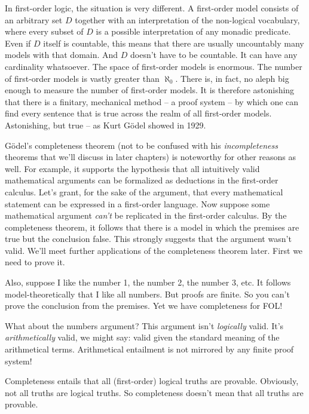 In first-order logic,
the situation is very different.
A first-order model consists of an arbitrary set $D$
together with an interpretation of the non-logical vocabulary,
where every subset of $D$ is a possible interpretation of any monadic predicate.
Even if $D$ itself is countable,
this means that there are usually uncountably many models with that domain.
And $D$ doesn't have to be countable.
It can have any cardinality whatsoever.
The space of first-order models is enormous.
The number of first-order models is vastly greater than $\aleph_0$.
There is, in fact, no aleph big enough to measure the number of first-order models.
It is therefore astonishing that
there is a finitary, mechanical method
-- a proof system --
by which one can find every sentence
that is true across the realm of all first-order models.
Astonishing, but true --
as Kurt Gödel showed in 1929.

Gödel's completeness theorem
(not to be confused with his \emph{incompleteness} theorems
that we'll discuss in later chapters)
is noteworthy for other reasons as well.
For example,
it supports the hypothesis
that all intuitively valid mathematical arguments can be formalized
as deductions in the first-order calculus.
Let's grant, for the sake of the argument, that
every mathematical statement can be expressed in a first-order language.
Now suppose some mathematical argument \emph{can't} be replicated in the first-order calculus.
By the completeness theorem,
it follows that
there is a model in which the premises are true but the conclusion false.
This strongly suggests that the argument wasn't valid.
We'll meet further applications of the completeness theorem later.
First we need to prove it.

\iffalse

Also,
suppose I like the number 1, the number 2, the number 3, etc.
It follows model-theoretically that I like all numbers.
But proofs are finite.
So you can't prove the conclusion from the premises.
Yet we have completeness for FOL!

What about the numbers argument?
This argument isn't \textit{logically} valid.
It's \textit{arithmetically} valid, we might say:
valid given the standard meaning of the arithmetical terms.
Arithmetical entailment is not mirrored by any finite proof system!

Completeness entails that all (first-order) logical truths are provable.
Obviously, not all truths are logical truths.
So completeness doesn't mean that all truths are provable.

